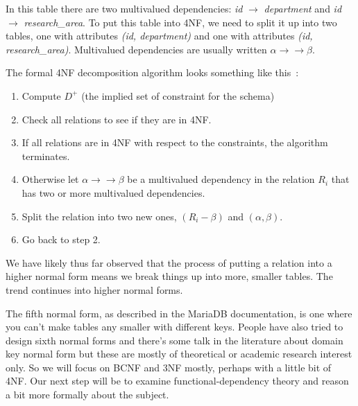 In this table there are two multivalued dependencies:  \textit{id} $\rightarrow$ \textit{department} and \textit{id} $\rightarrow$ \textit{research\_area}. To put this table into 4NF, we need to split it up into two tables, one with attributes \textit{(id, department)} and one with attributes \textit{(id, research\_area)}. Multivalued dependencies are usually written $\alpha \rightarrow\rightarrow \beta$.

The formal 4NF decomposition algorithm looks something like this~\cite{dsc}:

\begin{enumerate}
	\item Compute $D^{+}$ (the implied set of constraint for the schema)
	\item Check all relations to see if they are in 4NF.
	\item If all relations are in 4NF with respect to the constraints, the algorithm terminates.
	\item Otherwise let $\alpha \rightarrow\rightarrow \beta$ be a multivalued dependency in the relation $R_{i}$ that has two or more multivalued dependencies. 
	\item Split the relation into two new ones, $(R_{i} - \beta)$ and $(\alpha, \beta)$.
	\item Go back to step 2.
\end{enumerate}


We have likely thus far observed that the process of putting a relation into a higher normal form means we break things up into more, smaller tables. The trend continues into higher normal forms.

The fifth normal form, as described in the MariaDB documentation, is one where you can't make tables any smaller with different keys. People have also tried to design sixth normal forms and there's some talk in the literature about domain key normal form but these are mostly of theoretical or academic research interest only. So we will focus on BCNF and 3NF mostly, perhaps with a little bit of 4NF. Our next step will be to examine functional-dependency theory and reason a bit more formally about the subject.





